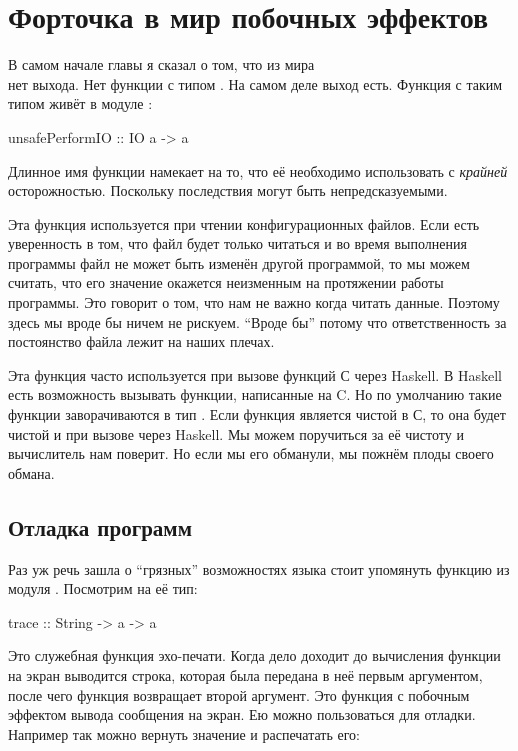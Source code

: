 \section{Форточка в мир побочных эффектов}

В самом начале главы я сказал о том, что из мира \\нет выхода.
Нет функции с типом . На самом деле выход есть. Функция с
таким типом живёт в модуле :


\begin{code}
unsafePerformIO :: IO a -> a
\end{code}

Длинное имя функции намекает на то, что её необходимо использовать с
\emph{крайней} осторожностью. Поскольку последствия могут быть
непредсказуемыми.

Эта функция используется при чтении конфигурационных файлов. Если есть
уверенность в том, что файл будет только читаться и во время выполнения
программы файл не может быть изменён другой программой, то мы можем
считать, что его значение окажется неизменным на протяжении работы
программы. Это говорит о том, что нам не важно когда читать данные.
Поэтому здесь мы вроде бы ничем не рискуем. ``Вроде бы'' потому что
ответственность за постоянство файла лежит на наших плечах.

Эта функция часто используется при вызове функций С через Haskell. В
Haskell есть возможность вызывать функции, написанные на C. Но по
умолчанию такие функции заворачиваются в тип . Если функция
является чистой в С, то она будет чистой и при вызове через Haskell. Мы
можем поручиться за её чистоту и вычислитель нам поверит. Но если мы его
обманули, мы пожнём плоды своего обмана.

\subsection{Отладка программ}

Раз уж речь зашла о ``грязных'' возможностях языка стоит упомянуть
функцию  из модуля . Посмотрим на её тип:


\begin{code}
trace :: String -> a -> a
\end{code}

Это служебная функция эхо-печати. Когда дело доходит до вычисления
функции  на экран выводится строка, которая была передана в
неё первым аргументом, после чего функция возвращает второй аргумент.
Это функция  с побочным эффектом вывода сообщения на экран. Ею
можно пользоваться для отладки. Например так можно вернуть значение и
распечатать его:


